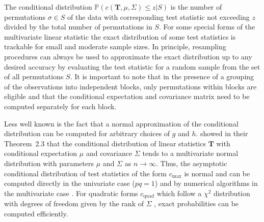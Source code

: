 \documentclass{article}
\newcommand{\Rpackage}[1]{{\normalfont\fontseries{b}\selectfont #1}}
\newcommand{\Prob}{\mathbb{P} }
\newcommand{\T}{\mathbf{T}}
\begin{document}

The conditional distribution $\Prob(c(\T, \mu, \Sigma) \le z | S)$
is the number of permutations $\sigma \in S$ of the data 
with corresponding test statistic not exceeding $z$ divided by the total number
of permutations in $S$. For some special forms of the
multivariate linear statistic the exact distribution of some 
test statistics is trackable for small and moderate sample sizes.
In principle, resampling procedures can always be used to 
approximate the exact distribution up to any desired accuracy by evaluating
the test statistic for a random sample from the set of all permutations $S$.
It is important to note that in the presence of a grouping of the observations
into independent blocks, 
only permutations within blocks are eligible and that the
conditional expectation and covariance matrix need to be computed
separately for each block.

Less well known is the fact that 
a normal approximation of the conditional distribution can be computed 
for arbitrary choices of $g$ and $h$. 
\cite{StrasserWeber1999} showed in their Theorem~2.3 that the   
conditional distribution of linear statistics $\T$ with conditional    
expectation $\mu$ and covariance $\Sigma$ tends to a multivariate normal
distribution with parameters $\mu$ and $\Sigma$ as $n \rightarrow
\infty$. Thus, the asymptotic conditional distribution of test statistics of
the form $c_\text{max}$ is normal and
can be computed directly in the univariate case ($pq = 1$) and by numerical 
algorithms in the multivariate case \citep{numerical-:1992}.
For quadratic forms
$c_\text{quad}$ which follow a $\chi^2$ distribution with degrees of freedom
given by the rank of $\Sigma$ \citep[see][Chapter 29]{johnsonkotz1970}, exact
probabilities can be computed efficiently.
\end{document}
